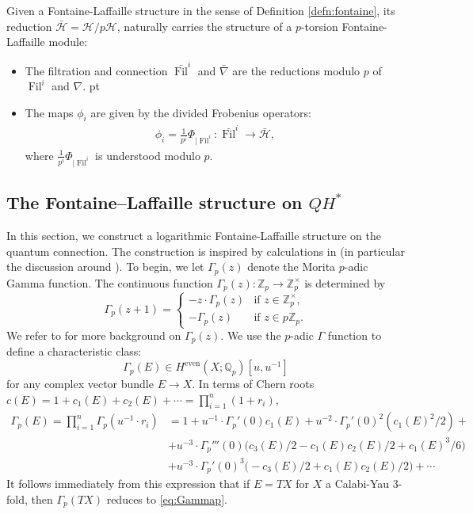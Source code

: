 \documentclass[reqno]{amsart}
\numberwithin{equation}{section}
\numberwithin{equation}{section}
\numberwithin{equation}{section}
\theoremstyle{definition}
\theoremstyle{remark}
\theoremstyle{remark}
\newcommand{\calH}{\mathcal{H}}
\begin{document}
Given a Fontaine-Laffaille structure in the sense of Definition \ref{defn:fontaine}, its reduction $\bar{\calH}=\calH/p\calH$, naturally carries the structure of a $p$-torsion Fontaine-Laffaille module: \begin{itemize} \item The filtration and connection $\bar{\operatorname{Fil}}^i$ and $\bar{\nabla}$ are the reductions modulo $p$ of $\operatorname{Fil}^i$ and $\nabla.$  pt \item The maps $\phi_i$ are given by the divided Frobenius operators: \begin{align} \phi_i = \frac{1}{p^i} \Phi_{|\operatorname{Fil}^i}: \bar{\operatorname{Fil}}^i \to \bar{\calH}, \end{align}
where $\frac{1}{p^i} \Phi_{|\operatorname{Fil}^i}$ is understood modulo $p.$ \end{itemize}

\subsection{The Fontaine--Laffaille structure on $QH^*$}\label{sect:FLonQH}
In this section, we construct a logarithmic Fontaine-Laffaille structure on the quantum connection. The construction is inspired by calculations in \cite{KSV06} (in particular the discussion around \cite[Lemma 3]{KSV06}). To begin, we let $\Gamma_p(z)$ denote the  Morita $p$-adic Gamma function. The continuous function $\Gamma_p(z): \mathbb{Z}_p \to \mathbb{Z}_p^\times$ is determined by
\begin{equation}
\Gamma_p(z+1) = 
\begin{cases}
 -z \cdot\Gamma_p(z) & \text{if } z \in \mathbb{Z}_p^{\times}, \\
-\Gamma_p(z) & \text{if } z \in p\mathbb{Z}_p.
\end{cases}
\end{equation}
We refer to \cite[Chapter 11]{cohen-vol2} for more background on $\Gamma_p(z)$. We use the $p$-adic $\Gamma$ function to define a characteristic class:
\begin{equation}
\Gamma_p(E) \in H^{\mathrm{even}}(X;\mathbb{Q}_p)[u,u^{-1}]
\end{equation}
for any complex vector bundle $E \rightarrow X$. In terms of Chern roots $c(E) = 1 + c_1(E) + c_2(E) + \cdots = \prod_{i=1}^n (1+r_i)$, 
\begin{equation} \label{eq:gamma-characteristic-class}
\begin{aligned}
\Gamma_p(E) = \prod_{i=1}^n \Gamma_p(u^{-1}\cdot r_i) &
= 1 + u^{-1}\cdot \Gamma_p'(0)c_1(E) + u^{-2}\cdot \Gamma_p'(0)^2 (c_1(E)^2/2) + 
\\[-.5em] 
& 
+ u^{-3}\cdot \Gamma_p'''(0) \big(c_3(E)/2 - c_1(E)c_2(E)/2 + c_1(E)^3/6 \big) \\ 
& 
+ u^{-3}\cdot \Gamma_p'(0)^3 \big(-\!c_3(E)/2 + c_1(E)c_2(E)/2 \big) + \cdots
\end{aligned}
\end{equation}
It follows immediately from this expression that if $E=TX$ for $X$ a Calabi-Yau 3-fold, then $\Gamma_p(TX)$ reduces to \eqref{eq:Gammap}.
\end{document}
